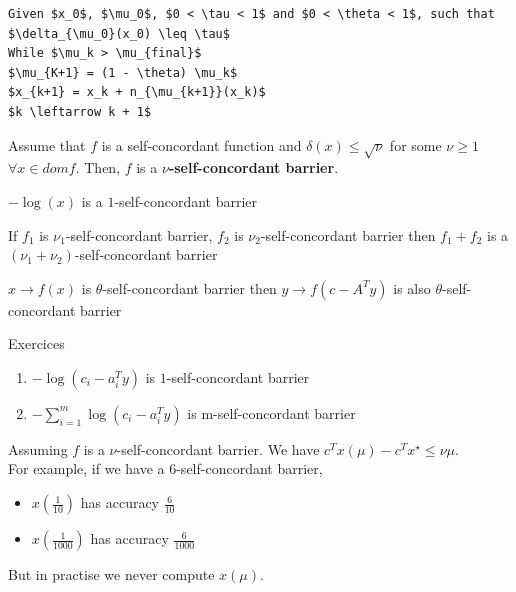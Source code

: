 \begin{lstlisting}[mathescape,caption=Interior Point Algorithm]
Given $x_0$, $\mu_0$, $0 < \tau < 1$ and $0 < \theta < 1$, such that $\delta_{\mu_0}(x_0) \leq \tau$
While $\mu_k > \mu_{final}$
$\mu_{K+1} = (1 - \theta) \mu_k$ 
$x_{k+1} = x_k + n_{\mu_{k+1}}(x_k)$
$k \leftarrow k + 1$
\end{lstlisting}


\begin{definition} Assume that $f$ is a self-concordant function and $\delta (x) \leq \sqrt{\nu}$ for some $\nu \geq 1$ $\forall x \in dom f$. Then, $f$ is a \textbf{$\nu$-self-concordant barrier}.
\end{definition}

\begin{example}
\begin{leftbar}
$- \log (x)$ is a $1$-self-concordant barrier 
\end{leftbar}
\end{example}

\begin{property}
If $f_1$ is $\nu_1$-self-concordant barrier, $f_2$ is $\nu_2$-self-concordant barrier then $f_1 + f_2$ is a $(\nu_1 + \nu_2)$-self-concordant barrier
\end{property}
 
\begin{property}
$x \rightarrow f(x)$ is $\theta$-self-concordant barrier then $y \rightarrow f(c - A^T y)$ is also $\theta$-self-concordant barrier
\end{property}

\begin{example}
\begin{leftbar}
Exercices 
\begin{enumerate}
\item $- \log (c_i - a_i^T y)$ is $1$-self-concordant barrier
\item $- \sum_{i=1}^m \log (c_i - a_i^T y)$ is m-self-concordant barrier
\end{enumerate}
\end{leftbar}
\end{example}

Assuming $f$ is a $\nu$-self-concordant barrier. We have $c^T x(\mu) - c^T x^{\star} \leq \nu\mu$.\\
For example, if we have a 6-self-concordant barrier,
\begin{itemize}
\item $x(\frac{1}{10})$ has accuracy $\frac{6}{10}$
\item $x(\frac{1}{1000})$ has accuracy $\frac{6}{1000}$
\end{itemize}
But in practise we never compute $x(\mu)$.\\

